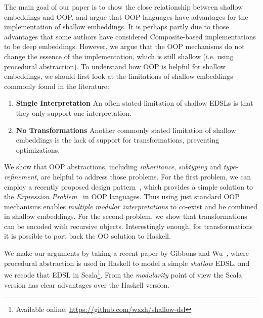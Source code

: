 The main goal of our paper is to show the close relationship between 
shallow embeddings and OOP, and argue that OOP languages have
advantages for the implementation of shallow embeddings. 
It is perhaps partly due to those advantages that some authors 
have considered  {\sc Composite}-based implementations to be deep
embeddings. However, we argue that the OOP
mechanisms do not change the essence of the implementation, which is
still shallow (i.e. using procedural abstraction). 
To understand how
OOP is helpful for shallow embeddings, we should first look at the
limitations of shallow embeddings commonly found in the literature:
\begin{enumerate}

\item {\bf Single Interpretation} An often stated limitation of
  shallow EDSLs is that they only support one
  interpretation.

\item {\bf No Transformations} Another commonly stated limitation 
of shallow embeddings is the lack of support for transformations,
preventing optimizations.

\end{enumerate}

We show that OOP abstractions, including \emph{
  inheritance}, \emph{subtyping} and \emph{type-refinement}, are
helpful to address those problems. For the first problem, we can
employ a recently proposed design pattern~\cite{eptrivially16}, which provides a simple
solution to the \emph{Expression Problem}~\cite{expPb} in OOP languages. Thus
using just standard OOP mechanisms enables \emph{multiple modular
  interpretations} to co-exist and be combined in shallow embeddings.
For the second problem, we show that transformations can be encoded 
with recursive objects. Interestingly enough, for transformations it
is possible to port back the OO solution to
Haskell.

We make our arguments by taking a recent paper by Gibbons and Wu~\cite{gibbons2014folding},
where procedural abstraction is used in Haskell to model a simple \emph{shallow}
EDSL, and we recode that EDSL in Scala\footnote{Available online: \url{https://github.com/wxzh/shallow-dsl}}.
From the \emph{modularity} point of view the
Scala version has clear advantages over the Haskell version.

